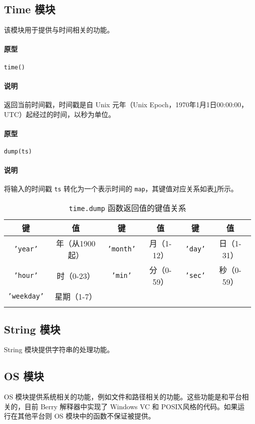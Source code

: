 \subsection{Time 模块}

该模块用于提供与时间相关的功能。


\paragraph{原型}
\begin{lstlisting}[language=berry, numbers=none]
time()
\end{lstlisting}

\paragraph{说明}
返回当前时间戳，时间戳是自 Unix 元年（Unix Epoch，1970年1月1日00:00:00，UTC）起经过的时间，以秒为单位。


\paragraph{原型}
\begin{lstlisting}[language=berry, numbers=none]
dump(ts)
\end{lstlisting}

\paragraph{说明}
将输入的时间戳 \texttt{ts} 转化为一个表示时间的 \texttt{map}，其键值对应关系如表\ref{tab::time_dump_map}所示。
\begin{table}[htb]
    \centering
    \setlength{\tabcolsep}{2mm}
    \begin{tabular}{cccccc} \Xhline{1pt}
        \textbf{键} & \textbf{值} & \textbf{键} & \textbf{值} & \textbf{键} & \textbf{值} \\ \hline
        \texttt{'year'} & 年（从1900起） & \texttt{'month'} & 月（1-12） & \texttt{'day'} & 日（1-31） \\
        \texttt{'hour'} & 时（0-23） & \texttt{'min'} & 分（0-59） & \texttt{'sec'} & 秒（0-59） \\
        \texttt{'weekday'} & 星期（1-7） \\
        \Xhline{1pt}
    \end{tabular}
    \caption{\texttt{time.dump} 函数返回值的键值关系}
    \label{tab::time_dump_map}
\end{table}

\subsection{String 模块}

String 模块提供字符串的处理功能。

\subsection{OS 模块}

OS 模块提供系统相关的功能，例如文件和路径相关的功能。这些功能是和平台相关的，目前 Berry 解释器中实现了 Windows VC 和 POSIX风格的代码。如果运行在其他平台则 OS 模块中的函数不保证被提供。
